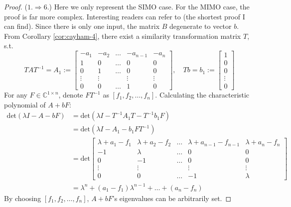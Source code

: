 \documentclass[
]{book}
\theoremstyle{definition}
\theoremstyle{definition}
\theoremstyle{definition}
\theoremstyle{definition}
\theoremstyle{remark}
\begin{document}
\begin{proof}
(\(1. \Rightarrow 6.\)) Here we only represent the SIMO case. For the MIMO case, the proof is far more complex. Interesting readers can refer to \citep{davison1968tac-poleassign} (the shortest proof I can find). Since there is only one input, the matrix \(B\) degenerate to vector \(b\). From Corollary \ref{cor:cayham-4}, there exist a similarity transformation matrix \(T\), s.t.
\begin{equation*}
   T A T^{-1} = A_1 := \begin{bmatrix}
      -a_1 & -a_2 & \dots & -a_{n-1} & -a_n \\
      1 & 0 & \dots & 0 & 0 \\
      0 & 1 & \dots & 0 & 0 \\
      \vdots & \vdots &  & \vdots & \vdots \\
      0 & 0 & \dots & 1 & 0
   \end{bmatrix}, \quad
   T b = b_1 := \begin{bmatrix}
      1 \\ 0 \\ 0 \\ \vdots \\ 0
   \end{bmatrix}
\end{equation*}
For any \(F \in \mathbb{C}^{1 \times n}\), denote \(FT^{-1}\) as \([f_1, f_2, \dots, f_n]\). Calculating the characteristic polynomial of \(A + bF\):
\begin{equation*}
   \begin{split}
      \text{det}(\lambda I - A - bF) & = \text{det}(\lambda I - T^{-1}A_1 T - T^{-1} b_1 F) \\
      & = \text{det}(\lambda I - A_1 - b_1 F T^{-1}) \\
      & = \text{det} \begin{bmatrix}
         \lambda + a_1 - f_1 & \lambda + a_2 - f_2 & \dots & \lambda + a_{n-1} - f_{n-1} & \lambda + a_n - f_n \\
         -1 & \lambda & \dots & 0 & 0 \\
         0 & -1 & \dots & 0 & 0 \\
         \vdots & \vdots &  & \vdots & \vdots \\
         0 & 0 & \dots & -1 & \lambda
      \end{bmatrix} \\
      & = \lambda^n + (a_1 - f_1) \lambda^{n-1} + \dots + (a_n - f_n)
   \end{split}
\end{equation*}
By choosing \([f_1, f_2, \dots, f_n]\), \(A+bF\)'s eigenvalues can be arbitrarily set.


\end{proof}
\end{document}
